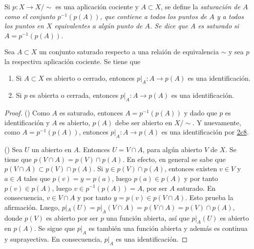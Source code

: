 
\begin{definition}
Si $p : X \longrightarrow X/\sim$ es una aplicación cociente y $A \subset X$, se define la \itshape{saturación} de $A$ como el conjunto $p^{-1}(p(A))$, que contiene a todos los puntos de $A$ y a todos los puntos en $X$ equivalentes a algún punto de $A$. Se dice que $A$ es \itshape{saturado} si $A = p^{-1}(p(A))$.
\end{definition}

\begin{proposition}
Sea $A \subset X$ un conjunto saturado respecto a una relaión de equivalencia $\sim$ y sea $p$ la respectiva aplicación cociente. Se tiene que
\begin{enumerate}[label=\textnormal{(\roman*)}]
\item Si $A \subset X$ es abierto o cerrado, entonces $p|_A : A \longrightarrow p(A)$ es una identificación.
\item Si $p$ es abierta o cerrada, entonces $p|_A : A \longrightarrow p(A)$ es una identificación.
\end{enumerate}
\end{proposition}

\begin{proof}
({}) Como $A$ es saturado, entonces $A = p^{-1}(p(A))$ y dado que $p$ es identificación y $A$ es abierto, $p(A)$ debe ser abierto en $X/\sim$. Y nuevamente, como $A = p^{-1}(p(A))$, entonces $p|_A : A \longrightarrow p(A)$ es una identificación por \hyperref[card:2c8]{\textsf{2c8}}.
\bigskip

({}) Sea $U$ un abierto en $A$. Entonces $U = V \cap A$, para algún abierto $V$ de $X$. Se tiene que $p(V \cap A) = p(V) \cap p(A)$. En efecto, en general se sabe que $p(V \cap A) \subset p(V) \cap p(A)$. Si $y \in p(V) \cap p(A)$, entonces existen $v \in V$ y $a \in A$ tales que $ p(v) = y = p(a)$, luego $p(a) \in p(A)$ y por tanto $p(v) \in p(A)$, luego $v \in p^{-1}(p(A)) = A$, por ser $A$ saturado. En consecuencia, $v \in V \cap A$ y por tanto $y = p(v) \in p(V \cap A)$. Esto prueba la afirmación. Luego, $p|_A(U) = p|_A(V \cap A) = p(V \cap A) = p(V) \cap p(A)$, donde $p(V)$ es abierto por ser $p$ una función abierta, así que $p|_A(U)$ es abierto en $p(A)$. Se sigue que $p|_A$ es también una función abierta y además es continua y suprayectiva. En consecuencia, $p|_A$ es una identificación.
\end{proof}
